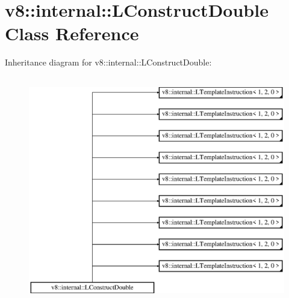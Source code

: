 \hypertarget{classv8_1_1internal_1_1_l_construct_double}{}\section{v8\+:\+:internal\+:\+:L\+Construct\+Double Class Reference}
\label{classv8_1_1internal_1_1_l_construct_double}
Inheritance diagram for v8\+:\+:internal\+:\+:L\+Construct\+Double\+:\begin{figure}[H]
\begin{center}
\leavevmode
\includegraphics[height=10.000000cm]{classv8_1_1internal_1_1_l_construct_double}
\end{center}
\end{figure}
